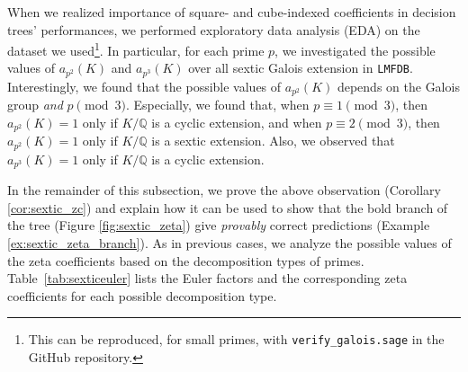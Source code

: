 \documentclass[letterpaper, 10pt]{article}
\newcommand{\bQ}{\mathbb{Q}}
\newcommand{\1}{\mathds{1}}	%
\theoremstyle{definition}
\theoremstyle{remark}
\begin{document}
When we realized importance of square- and cube-indexed coefficients in decision trees' performances, we performed exploratory data analysis (EDA) on the dataset we used\footnote{This can be reproduced, for small primes, with \texttt{verify\_galois.sage} in the GitHub repository.}. In particular, for each prime $p$, we investigated the possible values of $a_{p^2}(K)$ and $a_{p^3}(K)$ over all sextic Galois extension in \texttt{LMFDB}.
Interestingly, we found that the possible values of $a_{p^2}(K)$ depends on the Galois group \emph{and} $p \pmod{3}$.
Especially, we found that, when $p \equiv 1 \pmod{3}$, then $a_{p^2}(K) = 1$ only if $K / \bQ$ is a cyclic extension, and when $p \equiv 2 \pmod{3}$, then $a_{p^2}(K) = 1$ only if $K / \bQ$ is a sextic extension.
Also, we observed that $a_{p^3}(K) = 1$ only if $K / \bQ$ is a cyclic extension.


 In the remainder of this subsection, we prove the above observation (Corollary \ref{cor:sextic_zc}) and explain how it can be used to show that the bold branch of the tree (Figure \ref{fig:sextic_zeta}) give \emph{provably} correct predictions (Example \ref{ex:sextic_zeta_branch}). 
As in previous cases, we analyze the possible values of the zeta coefficients based on the decomposition types of primes.  
Table~\ref{tab:sexticeuler} lists the Euler factors and the corresponding zeta coefficients for each possible decomposition type.
\end{document}
